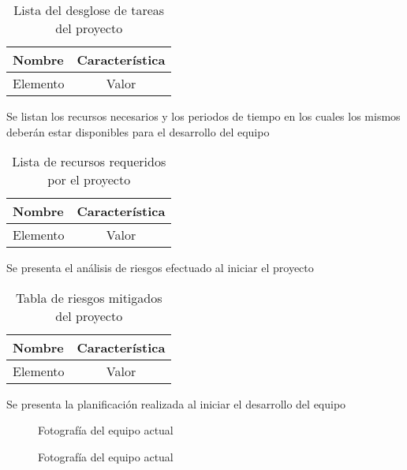 \begin{table}[h!]
	\centering
	\caption{Lista del desglose de tareas del proyecto}
	\begin{tabular}{l c}    
		\toprule
		\textbf{Nombre} 	& \textbf{Característica}	\\
		\midrule
		Elemento 			& Valor	\\
		\bottomrule
		\hline
	\end{tabular}
	\label{tab:ListaTareas}
\end{table}

Se listan los recursos necesarios y los periodos de tiempo en los cuales los mismos deberán estar disponibles para el desarrollo del equipo

\begin{table}[h!]
	\centering
	\caption{Lista de recursos requeridos por el proyecto}
	\begin{tabular}{l c}    
		\toprule
		\textbf{Nombre} 	& \textbf{Característica}	\\
		\midrule
		Elemento 			& Valor	\\
		\bottomrule
		\hline
	\end{tabular}
	\label{tab:ListaRecursos}
\end{table}

Se presenta el análisis de riesgos efectuado al iniciar el proyecto

\begin{table}[ht]
	\centering
	\caption{Tabla de riesgos mitigados del proyecto}
	\begin{tabular}{l c}    
		\toprule
		\textbf{Nombre} 	& \textbf{Característica}	\\
		\midrule
		Elemento 			& Valor	\\
		\bottomrule
		\hline
	\end{tabular}
	\label{tab:ListaRiesgos}
\end{table}

Se presenta la planificación realizada al iniciar el desarrollo del equipo

\begin{figure}[ht]
	\centering
	\caption{Fotografía del equipo actual}
	\label{fig:DiagramaAON}
\end{figure}

\begin{figure}[ht]
	\centering
	\caption{Fotografía del equipo actual}
	\label{fig:DiagramaGantt}
\end{figure}
